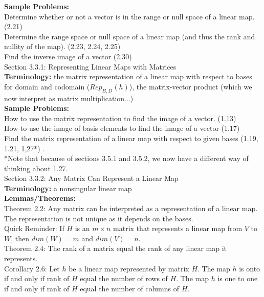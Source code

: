 \documentclass[11pt,fleqn]{article}
\begin{document}
\textbf{Sample Problems:} \\
Determine whether or not a vector is in the range or null space of a linear map. (2.21)\\
Determine the range space or null space of a linear map (and thus the rank and nullity of the map). (2.23, 2.24, 2.25)\\
Find the inverse image of a vector (2.30)\\

\noindent Section 3.3.1: Representing Linear Maps with Matrices\\

\textbf{Terminology:} the matrix representation of a linear map with respect to bases for domain and codomain ($Rep_{B,D}(h)$), the matrix-vector product (which we now interpret as matrix multiplication...) \\


\textbf{Sample Problems:} \\
How to use the matrix representation to find the image of a vector. (1.13)\\
How to use the image of basis elements to find the image of a vector (1.17)\\
Find the matrix representation of a linear map with respect to given bases (1.19, 1.21, 1,27*) . \\
*Note that because of sections 3.5.1 and 3.5.2, we now have a different way of thinking about 1.27.\\

\noindent Section 3.3.2: Any Matrix Can Represent a Linear Map \\

\textbf{Terminology:} a nonsingular linear map\\

\textbf{Lemmas/Theorems:} \\
Theorem 2.2: Any matrix can be interpreted as a representation of a linear map. The representation is not unique as it depends on the bases.\\
Quick Reminder: If $H$ is an $m \times n$ matrix that represents a linear map from $V$ to $W$, then $dim(W)=m$ and $dim(V)=n.$\\
Theorem 2.4: The rank of a matrix equal the rank of any linear map it represents.\\
Corollary 2.6: Let $h$ be a linear map represented by matrix $H$. The map $h$ is onto if and only if rank of $H$ equal the number of rows of $H.$ The map $h$ is one to one if and only if rank of $H$ equal the number of columns of $H.$ \\
\end{document}
